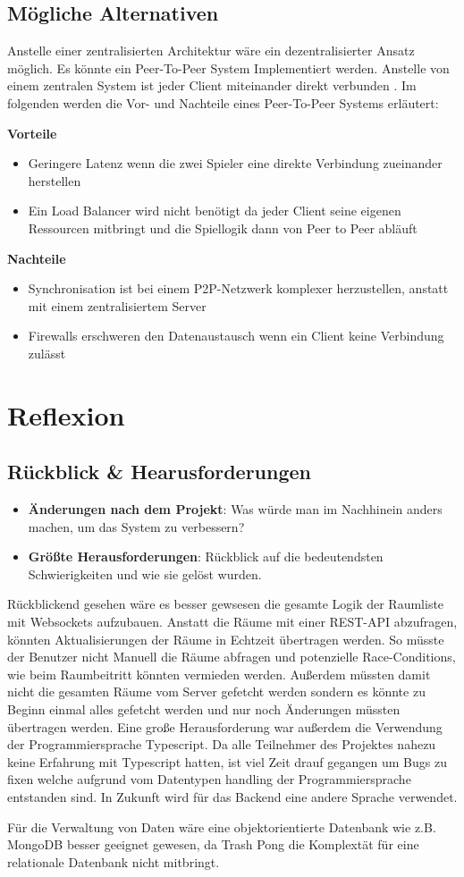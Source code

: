 \documentclass[
]{article}
\begin{document}
\subsection{Mögliche Alternativen}
Anstelle einer zentralisierten Architektur wäre ein dezentralisierter Ansatz möglich. Es könnte ein Peer-To-Peer System Implementiert werden. Anstelle von einem zentralen System ist jeder Client miteinander direkt verbunden \cite{gordon2001distributed}. Im folgenden werden die Vor- und Nachteile eines Peer-To-Peer Systems erläutert:

\textbf{Vorteile}
\begin{itemize}
\item Geringere Latenz wenn die zwei Spieler eine direkte Verbindung zueinander herstellen
\item Ein Load Balancer wird nicht benötigt da jeder Client seine eigenen Ressourcen mitbringt und die Spiellogik dann von Peer to Peer abläuft
\end{itemize}

\textbf{Nachteile}
\begin{itemize}
\item Synchronisation ist bei einem P2P-Netzwerk komplexer herzustellen, anstatt mit einem zentralisiertem Server
\item Firewalls \glqq erschweren\grqq{} den Datenaustausch wenn ein Client keine Verbindung zulässt \cite{gordon2001distributed}
\end{itemize}

\section{Reflexion}

\subsection{Rückblick \& Hearusforderungen}
\begin{itemize}
    \item \textbf{Änderungen nach dem Projekt}: Was würde man im Nachhinein anders machen, um das System zu verbessern?
      \item \textbf{Größte Herausforderungen}: Rückblick auf die bedeutendsten Schwierigkeiten und wie sie gelöst wurden.
\end{itemize}
Rückblickend gesehen wäre es besser gewsesen die gesamte Logik der Raumliste mit Websockets aufzubauen. Anstatt die Räume mit einer REST-API abzufragen, könnten Aktualisierungen der Räume in Echtzeit übertragen werden. So müsste der Benutzer nicht Manuell die Räume abfragen und potenzielle Race-Conditions, wie beim Raumbeitritt könnten vermieden werden. Außerdem müssten damit nicht die gesamten Räume vom Server gefetcht werden sondern es könnte zu Beginn einmal alles gefetcht werden und nur noch Änderungen müssten übertragen werden.   
Eine große Herausforderung war außerdem die Verwendung der Programmiersprache Typescript. Da alle Teilnehmer des Projektes nahezu keine Erfahrung mit Typescript hatten, ist viel Zeit drauf gegangen um Bugs zu fixen welche aufgrund vom Datentypen handling der Programmiersprache entstanden sind. In Zukunft wird für das Backend eine andere Sprache verwendet.

Für die Verwaltung von Daten wäre eine objektorientierte Datenbank wie z.B. MongoDB besser geeignet gewesen, da 
Trash Pong die Komplextät für eine relationale Datenbank nicht mitbringt. 
\newpage
 \printbibliography[title={Quellen}]
\end{document}
